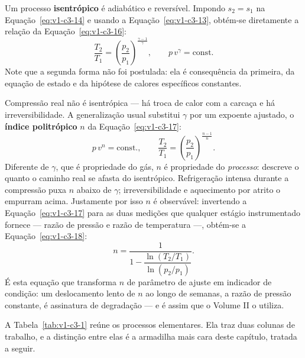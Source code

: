 \documentclass[12pt,a4paper]{article}
\numberwithin{equation}{section}
\numberwithin{table}{section}
\numberwithin{figure}{section}
\begin{document}
Um processo \textbf{isentrópico} é adiabático e reversível. Impondo
$s_2 = s_1$ na Equação~\eqref{eq:v1-c3-14} e usando a
Equação~\eqref{eq:v1-c3-13}, obtém-se diretamente a relação da
Equação~\eqref{eq:v1-c3-16}:
\begin{equation}\label{eq:v1-c3-16}
\frac{T_2}{T_1} = \left(\frac{p_2}{p_1}\right)^{\frac{\gamma-1}{\gamma}},
\qquad
p\,v^{\gamma} = \text{const.}
\end{equation}
Note que a segunda forma não foi postulada: ela é consequência da primeira, da
equação de estado e da hipótese de calores específicos constantes.

Compressão real não é isentrópica --- há troca de calor com a carcaça e há
irreversibilidade. A generalização usual substitui $\gamma$ por um expoente
ajustado, o \textbf{índice politrópico} $n$ da
Equação~\eqref{eq:v1-c3-17}:
\begin{equation}\label{eq:v1-c3-17}
p\,v^{n} = \text{const.},
\qquad
\frac{T_2}{T_1} = \left(\frac{p_2}{p_1}\right)^{\frac{n-1}{n}} .
\end{equation}
Diferente de $\gamma$, que é propriedade do gás, $n$ é propriedade do
\emph{processo}: descreve o quanto o caminho real se afasta do isentrópico.
Refrigeração intensa durante a compressão puxa $n$ abaixo de $\gamma$;
irreversibilidade e aquecimento por atrito o empurram acima. Justamente por
isso $n$ é observável: invertendo a Equação~\eqref{eq:v1-c3-17} para as duas
medições que qualquer estágio instrumentado fornece --- razão de pressão e
razão de temperatura ---, obtém-se a Equação~\eqref{eq:v1-c3-18}:
\begin{equation}\label{eq:v1-c3-18}
n = \frac{1}{1 - \dfrac{\ln(T_2/T_1)}{\ln(p_2/p_1)}} .
\end{equation}
É esta equação que transforma $n$ de parâmetro de ajuste em indicador de
condição: um deslocamento lento de $n$ ao longo de semanas, a razão de pressão
constante, é assinatura de degradação --- e é assim que o Volume II o utiliza.

A Tabela~\ref{tab:v1-c3-1} reúne os processos elementares. Ela traz duas
colunas de trabalho, e a distinção entre elas é a armadilha mais cara deste
capítulo, tratada a seguir.
\end{document}
